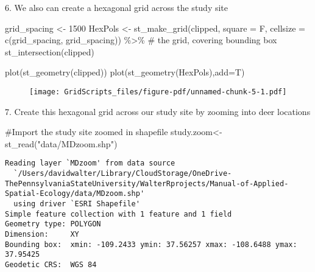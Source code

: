 \documentclass[
  letterpaper,
]{book}
\newenvironment{Shaded}{\begin{snugshade}}{\end{snugshade}}
\newcommand{\AttributeTok}[1]{\textcolor[rgb]{0.40,0.45,0.13}{#1}}
\newcommand{\CommentTok}[1]{\textcolor[rgb]{0.37,0.37,0.37}{#1}}
\newcommand{\DecValTok}[1]{\textcolor[rgb]{0.68,0.00,0.00}{#1}}
\newcommand{\FunctionTok}[1]{\textcolor[rgb]{0.28,0.35,0.67}{#1}}
\newcommand{\NormalTok}[1]{\textcolor[rgb]{0.00,0.23,0.31}{#1}}
\newcommand{\OtherTok}[1]{\textcolor[rgb]{0.00,0.23,0.31}{#1}}
\newcommand{\SpecialCharTok}[1]{\textcolor[rgb]{0.37,0.37,0.37}{#1}}
\newcommand{\StringTok}[1]{\textcolor[rgb]{0.13,0.47,0.30}{#1}}
\begin{document}
6. We also can create a hexagonal grid across the study site

\begin{Shaded}
\begin{Highlighting}[]
\NormalTok{grid\_spacing }\OtherTok{\textless{}{-}} \DecValTok{1500}
\NormalTok{HexPols }\OtherTok{\textless{}{-}} \FunctionTok{st\_make\_grid}\NormalTok{(clipped, }\AttributeTok{square =}\NormalTok{ F, }\AttributeTok{cellsize =} \FunctionTok{c}\NormalTok{(grid\_spacing, grid\_spacing)) }\SpecialCharTok{\%\textgreater{}\%} \CommentTok{\# the grid, covering bounding box}
  \FunctionTok{st\_intersection}\NormalTok{(clipped) }
  
\FunctionTok{plot}\NormalTok{(}\FunctionTok{st\_geometry}\NormalTok{(clipped))}
\FunctionTok{plot}\NormalTok{(}\FunctionTok{st\_geometry}\NormalTok{(HexPols),}\AttributeTok{add=}\NormalTok{T)}
\end{Highlighting}
\end{Shaded}

\begin{figure}[H]

{\centering \texttt{[image: GridScripts\_files/figure-pdf/unnamed-chunk-5-1.pdf]}

}

\end{figure}

7. Create this hexagonal grid across our study site by zooming into deer
locations

\begin{Shaded}
\begin{Highlighting}[]
\CommentTok{\#Import the study site zoomed in shapefile}
\NormalTok{study.zoom}\OtherTok{\textless{}{-}}\FunctionTok{st\_read}\NormalTok{(}\StringTok{"data/MDzoom.shp"}\NormalTok{)}
\end{Highlighting}
\end{Shaded}

\begin{verbatim}
Reading layer `MDzoom' from data source 
  `/Users/davidwalter/Library/CloudStorage/OneDrive-ThePennsylvaniaStateUniversity/WalterRprojects/Manual-of-Applied-Spatial-Ecology/data/MDzoom.shp' 
  using driver `ESRI Shapefile'
Simple feature collection with 1 feature and 1 field
Geometry type: POLYGON
Dimension:     XY
Bounding box:  xmin: -109.2433 ymin: 37.56257 xmax: -108.6488 ymax: 37.95425
Geodetic CRS:  WGS 84
\end{verbatim}
\end{document}
